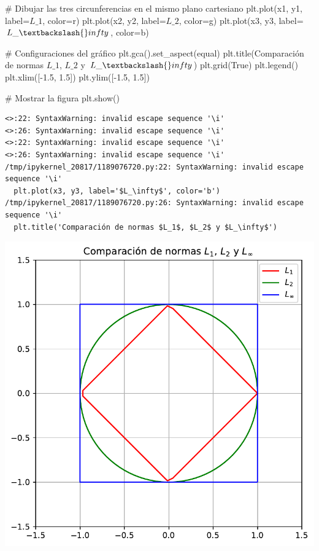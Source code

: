 \documentclass[
  letterpaper,
  DIV=11,
  numbers=noendperiod]{scrartcl}
\newenvironment{Shaded}{\begin{snugshade}}{\end{snugshade}}
\newcommand{\CommentTok}[1]{\textcolor[rgb]{0.37,0.37,0.37}{#1}}
\newcommand{\FloatTok}[1]{\textcolor[rgb]{0.68,0.00,0.00}{#1}}
\newcommand{\NormalTok}[1]{\textcolor[rgb]{0.00,0.23,0.31}{#1}}
\newcommand{\OperatorTok}[1]{\textcolor[rgb]{0.37,0.37,0.37}{#1}}
\newcommand{\StringTok}[1]{\textcolor[rgb]{0.13,0.47,0.30}{#1}}
\newcommand{\VariableTok}[1]{\textcolor[rgb]{0.07,0.07,0.07}{#1}}
\begin{document}
\begin{Shaded}
\begin{Highlighting}[]
\CommentTok{\# Dibujar las tres circunferencias en el mismo plano cartesiano}
\NormalTok{plt.plot(x1, y1, label}\OperatorTok{=}\StringTok{\textquotesingle{}$L\_1$\textquotesingle{}}\NormalTok{, color}\OperatorTok{=}\StringTok{\textquotesingle{}r\textquotesingle{}}\NormalTok{)}
\NormalTok{plt.plot(x2, y2, label}\OperatorTok{=}\StringTok{\textquotesingle{}$L\_2$\textquotesingle{}}\NormalTok{, color}\OperatorTok{=}\StringTok{\textquotesingle{}g\textquotesingle{}}\NormalTok{)}
\NormalTok{plt.plot(x3, y3, label}\OperatorTok{=}\StringTok{\textquotesingle{}$L\_\textbackslash{}infty$\textquotesingle{}}\NormalTok{, color}\OperatorTok{=}\StringTok{\textquotesingle{}b\textquotesingle{}}\NormalTok{)}

\CommentTok{\# Configuraciones del gráfico}
\NormalTok{plt.gca().set\_aspect(}\StringTok{\textquotesingle{}equal\textquotesingle{}}\NormalTok{)}
\NormalTok{plt.title(}\StringTok{\textquotesingle{}Comparación de normas $L\_1$, $L\_2$ y $L\_\textbackslash{}infty$\textquotesingle{}}\NormalTok{)}
\NormalTok{plt.grid(}\VariableTok{True}\NormalTok{)}
\NormalTok{plt.legend()}
\NormalTok{plt.xlim([}\OperatorTok{{-}}\FloatTok{1.5}\NormalTok{, }\FloatTok{1.5}\NormalTok{])}
\NormalTok{plt.ylim([}\OperatorTok{{-}}\FloatTok{1.5}\NormalTok{, }\FloatTok{1.5}\NormalTok{])}

\CommentTok{\# Mostrar la figura}
\NormalTok{plt.show()}
\end{Highlighting}
\end{Shaded}

\begin{verbatim}
<>:22: SyntaxWarning: invalid escape sequence '\i'
<>:26: SyntaxWarning: invalid escape sequence '\i'
<>:22: SyntaxWarning: invalid escape sequence '\i'
<>:26: SyntaxWarning: invalid escape sequence '\i'
/tmp/ipykernel_20817/1189076720.py:22: SyntaxWarning: invalid escape sequence '\i'
  plt.plot(x3, y3, label='$L_\infty$', color='b')
/tmp/ipykernel_20817/1189076720.py:26: SyntaxWarning: invalid escape sequence '\i'
  plt.title('Comparación de normas $L_1$, $L_2$ y $L_\infty$')
\end{verbatim}

\includegraphics{presentacion_files/figure-pdf/cell-9-output-2.pdf}
\end{document}
